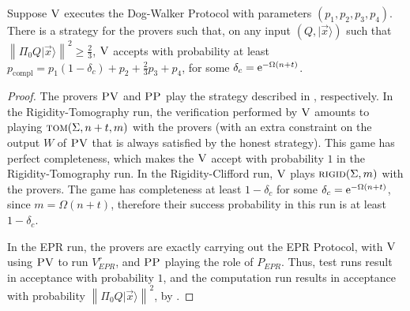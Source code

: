 \documentclass{toc}
\newcommand{\ket}[1]{|#1\rangle}
\DeclareMathOperator{\compl}{compl}
\newcommand{\norm}[1]{\left\|#1\right\|}
\newcommand{\rigid}{\textsc{rigid}}
\newcommand{\tom}{\textsc{tom}}
\newcommand{\ver}{\textsc{V}}
\newcommand{\pv}{\textsc{PV}}
\newcommand{\pp}{\textsc{PP}}
\begin{document}
\begin{lemma}\label{lem:dogwalker-completeness}
Suppose $\ver$ executes the Dog-Walker Protocol with parameters $(p_1,p_2,p_3,p_4)$.
There is a strategy for the provers such that, on any input $(Q,\ket{\vec{x}})$
  such that $\norm{\Pi_0 Q\ket{\vec{x}}}^2\geq \frac{2}{3}$, $\ver$ accepts with
  probability at least
  $p_{\compl}=p_1(1-\delta_c)+p_2+\frac{2}{3}p_3+p_4$, for some $\delta_c = \mathrm e^{-\Omega(n+t)}$.
\end{lemma}

\begin{proof}
The provers $\pv$ and $\pp$ play the strategy described in
,
  respectively. In the Rigidity-Tomography run, the verification performed by
  $\ver$ amounts to playing $\tom(\Sigma,n+t,m)$ with the provers (with an extra
  constraint on the output $W$ of $\pv$ that is always satisfied by the honest
  strategy). This game has perfect
  completeness, which makes the $\ver$
  accept with probability $1$ in the Rigidity-Tomography run.
  In the Rigidity-Clifford run, $\ver$ plays $\rigid(\Sigma,m)$
  with the provers. The game
  has completeness at least $1-\delta_c$ for some $\delta_c=\mathrm e^{-\Omega(n+t)}$,
  since $m=\Omega(n+t)$, therefore their success probability in this run is
  at least $1-\delta_c$.

In the EPR run, the provers are exactly carrying out the EPR Protocol, with $\ver$ using $\pv$ to run $V_{EPR}^r$, and $\pp$ playing the role of $P_{EPR}$. Thus, test runs result in acceptance with probability $1$, and the computation run results in acceptance with probability $\norm{\Pi_0 Q\ket{\vec{x}}}^2$, by . 
\end{proof}

\newpage   %
\end{document}
